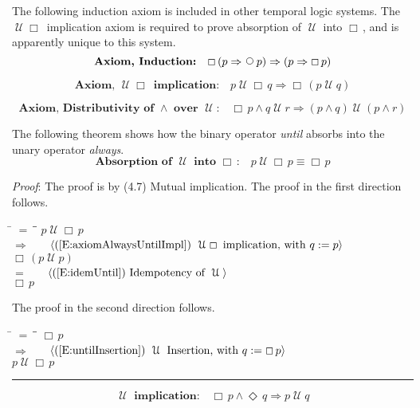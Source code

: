 \documentclass[12pt, fleqn, leqno]{article}
\newcommand{\lgap}{2pt}                             %
\newcommand{\mymathindent}{24pt}                    %
\newcommand{\impl}{\ensuremath{\Rightarrow}}        %
\newcommand{\Until}{\;\mathcal{U}\;}
\newcommand{\Next}{\;\,\text{\raisebox{3.5pt}{\circle{6}}}}
\newcommand{\Event}{\Diamond\,}
\newcommand{\Always}{\Box\,}
\newcommand{\myqed}{\rule[-.23ex]{1.2ex}{2.0ex}}
\newcommand{\myqedtab}{\hspace{384pt}}              %
\newcommand{\firstspacer}{\vspace{-26pt}}
\newcommand{\Gll} {\langle}                         %
\newcommand{\Ggg} {\rangle}                         %
\newcommand{\Hint}[1]     {\ \ \ $\Gll              \mbox{#1} \Ggg$ }   %
\begin{document}
The following induction axiom is included in other temporal logic systems.
The $\Until\Always$ implication axiom is required to prove absorption of $\Until$ into $\Always$,
and is apparently unique to this system.
\begin{equation}\label{E:induction}
\textbf{Axiom, Induction:}\quad \Always (p \impl \Next p) \impl (p \impl \Always p)
\end{equation}

\firstspacer

\begin{equation}\label{E:axiomAlwaysUntilImpl}
\textbf{Axiom, $\Until\Always$ implication:}\quad p\Until \Always q\impl \Always (p\Until q)
\end{equation}

\firstspacer

\begin{equation}\label{E:andUntilDist}
\textbf{Axiom, Distributivity of $\land$ over $\Until$:}\quad \Always p \land q \Until r \impl (p \land q) \Until (p \land r)
\end{equation}

The following theorem shows how the binary operator \textit{until} absorbs into the unary operator \textit{always}.
\begin{equation}\label{E:absUntilAlways}
\textbf{Absorption of $\Until$ into $\Always$:}\quad p \Until \Always p \equiv \Always p
\end{equation}

\emph{Proof}: The proof is by (4.7) Mutual implication.
The proof in the first direction follows.
\begin{tabbing}
\hspace{\mymathindent} \= $= \;$ \= \myqedtab \= \kill
\> \> $p \Until \Always p$\\[\lgap]
\> $\impl$ \> \Hint{(\ref{E:axiomAlwaysUntilImpl}) $\Until\Always$ implication, with $q:=p$} \\[\lgap]
\> \> $\Always (p \Until p)$\\[\lgap]
\> $=$ \> \Hint{(\ref{E:idemUntil}) Idempotency of $\Until$} \\[\lgap]
\> \> $\Always p$
\end{tabbing}
The proof in the second direction follows.
\begin{tabbing}
\hspace{\mymathindent} \= $= \;$ \= \myqedtab \= \kill
\> \> $\Always p$\\[\lgap]
\> $\impl$ \> \Hint{(\ref{E:untilInsertion}) $\Until$ Insertion, with $q:=\Always p$} \\[\lgap]
\> \> $p \Until \Always p$ \quad \myqed
\end{tabbing}
\begin{equation}\label{E:axiomUntilImpl}
\textbf{$\Until$ implication:}\quad \Always p \land \Event q \impl p \Until q
\end{equation}
\end{document}
